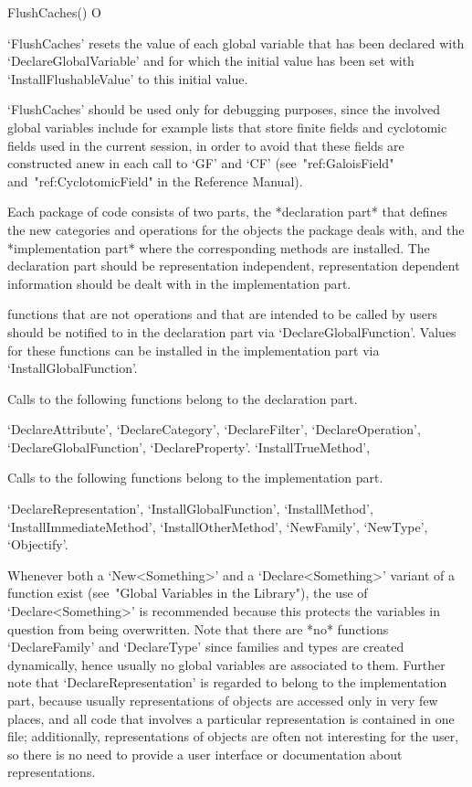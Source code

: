 \>FlushCaches() O

`FlushCaches' resets the value of each global variable that has
been declared with `DeclareGlobalVariable' and for which the initial
value has been set with `InstallFlushableValue' to this initial value.

`FlushCaches' should be used only for debugging purposes,
since the involved global variables include for example lists that store
finite fields and cyclotomic fields used in the current {\GAP} session,
in order to avoid that these fields are constructed anew in each call
to `GF' and `CF' (see~"ref:GaloisField" and~"ref:CyclotomicField"
in the Reference Manual).



Each package of {\GAP} code consists of two parts,
the *declaration part* that defines the new categories and operations for
the objects the package deals with,
and the *implementation part* where the corresponding methods are
installed.
The declaration part should be representation independent,
representation dependent information should be dealt with in the
implementation part.

{\GAP} functions that are not operations and that are intended to be
called by users should be notified to {\GAP} in the declaration part via
`DeclareGlobalFunction'.
Values for these functions can be installed in the implementation part
via `InstallGlobalFunction'.

Calls to the following functions belong to the declaration part.

`DeclareAttribute',
`DeclareCategory',
`DeclareFilter',
`DeclareOperation',
`DeclareGlobalFunction',
`DeclareProperty'.
`InstallTrueMethod',

Calls to the following functions belong to the implementation part.

`DeclareRepresentation',
`InstallGlobalFunction',
`InstallMethod',
`InstallImmediateMethod',
`InstallOtherMethod',
`NewFamily',
`NewType',
`Objectify'.

Whenever both a `New<Something>' and a `Declare<Something>' variant
of a function exist (see~"Global Variables in the Library"),
the use of `Declare<Something>' is recommended
because this protects the variables in question from being overwritten.
Note that there are *no* functions `DeclareFamily' and `DeclareType'
since families and types are created dynamically,
hence usually no global variables are associated to them.
Further note that `DeclareRepresentation' is regarded to belong to the
implementation part,
because usually representations of objects are accessed only in very
few places, and all code that involves a particular representation
is contained in one file;
additionally, representations of objects are often not interesting
for the user, so there is no need to provide a user interface
or documentation about representations.

